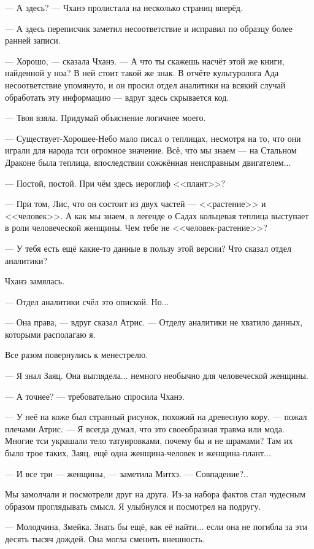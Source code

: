 --- А здесь? --- Чханэ пролистала на несколько страниц вперёд.

--- А здесь переписчик заметил несоответствие и исправил по образцу более ранней записи.

--- Хорошо, --- сказала Чханэ.
--- А что ты скажешь насчёт этой же книги, найденной у ноа?
В ней стоит такой же знак.
В отчёте культуролога Ада несоответствие упомянуто, и он просил отдел аналитики на всякий случай обработать эту информацию --- вдруг здесь скрывается код.

--- Твоя взяла.
Придумай объяснение логичнее моего.

--- Существует-Хорошее-Небо мало писал о теплицах, несмотря на то, что они играли для народа тси огромное значение.
Всё, что мы знаем --- на Стальном Драконе была теплица, впоследствии сожжённая неисправным двигателем...

--- Постой, постой.
При чём здесь иероглиф <<плант>>?

--- При том, Лис, что он состоит из двух частей --- <<растение>> и <<человек>>.
А как мы знаем, в легенде о Садах кольцевая теплица выступает в роли человеческой женщины.
Чем тебе не <<человек-растение>>?

--- У тебя есть ещё какие-то данные в пользу этой версии?
Что сказал отдел аналитики?

Чханэ замялась.

--- Отдел аналитики счёл это опиской.
Но...

--- Она права, --- вдруг сказал Атрис.
--- Отделу аналитики не хватило данных, которыми располагаю я.

Все разом повернулись к менестрелю.

--- Я знал Заяц.
Она выглядела... немного необычно для человеческой женщины.

--- А точнее? --- требовательно спросила Чханэ.

--- У неё на коже был странный рисунок, похожий на древесную кору, --- пожал плечами Атрис.
--- Я всегда думал, что это своеобразная травма или мода.
Многие тси украшали тело татуировками, почему бы и не шрамами?
Там их было трое таких, Заяц, ещё одна женщина-человек и женщина-плант...

--- И все три --- женщины, --- заметила Митхэ.
--- Совпадение?..

Мы замолчали и посмотрели друг на друга.
Из-за набора фактов стал чудесным образом проглядывать смысл.
Я улыбнулся и посмотрел на подругу.

--- Молодчина, Змейка.
Знать бы ещё, как её найти... если она не погибла за эти десять тысяч дождей.
Она могла сменить внешность.

